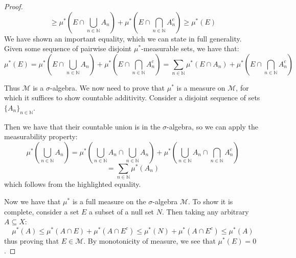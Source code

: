 \documentclass[10pt,letterpaper]{article} %
\begin{document}
\begin{proof}
\begin{equation*}
\geqslant \mu^*\left(E \cap \bigcup_{n \in \mathbb{N}}A_n\right) + \mu^*\left(E \cap \bigcap_{n \in \mathbb{N}}A_n^c\right) \geqslant \mu^*(E)
\end{equation*}
We have shown an important equality, which we can state in full generality. Given some sequence of pairwise disjoint $\mu^*$-measurable sets, we have that:
\begin{equation*}
\mu^*\left(E\right) = \mu^*\left(E \cap \bigcup_{n \in \mathbb{N}}A_n\right) + \mu^*\left(E \cap \bigcap_{n \in \mathbb{N}}A_n^c\right) = \sum_{n \in \mathbb{N}}\mu^*(E \cap A_n) + \mu^*\left(E \cap \bigcap_{n \in \mathbb{N}}A_n^c\right)
\end{equation*}


Thus $\mathcal{M}$ is a $\sigma$-algebra. We now need to prove that $\mu^*$ is a measure on $\mathcal{M}$, for which it suffices to show countable additivity. Consider a disjoint sequence of sets $\{A_n\}_{n \in \mathbb{N}}$.

Then we have that their countable union is in the $\sigma$-algebra, so we can apply the measurability property:
\begin{equation*}
\mu^*\left(\bigcup_{n \in \mathbb{N}}A_n\right) = \mu^*\left(\bigcup_{n \in \mathbb{N}}A_n \cap \bigcup_{n \in \mathbb{N}}A_n\right) + \mu^*\left(\bigcup_{n \in \mathbb{N}}A_n \cap \bigcap_{n \in \mathbb{N}}A_n^c\right)
\end{equation*}
\begin{equation*}
= \sum_{n \in \mathbb{N}}\mu^*(A_n)
\end{equation*}
which follows from the highlighted equality.

Now we have that $\mu^*$ is a full measure on the $\sigma$-algebra $\mathcal{M}$. To show it is complete, consider a set $E$ a subset of a null set $N$. Then taking any arbitrary $A \subseteq X$:
\begin{equation*}
\mu^*(A) \leqslant \mu^*(A \cap E) + \mu^*(A \cap E^c) \leqslant \mu^*(N) + \mu^*(A \cap E^c) \leqslant \mu^*(A)
\end{equation*}
thus proving that $E \in \mathcal{M}$. By monotonicity of measure, we see that $\mu^*(E) = 0$.
\end{proof}
\end{document}
